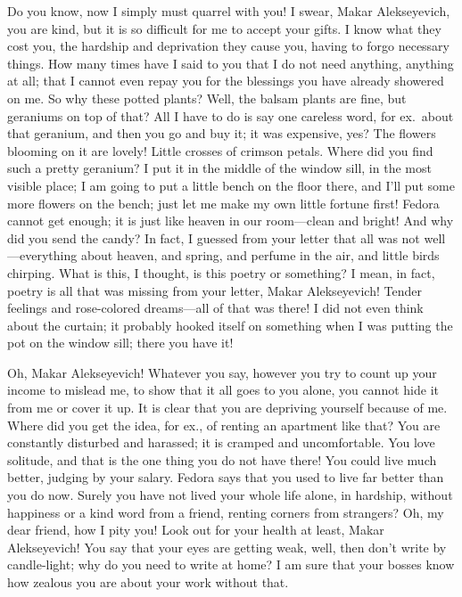 Do you know, now I simply must quarrel with you! I swear, Makar Alekseyevich, you are kind, but it is so difficult for me to accept your gifts. I know what they cost you, the hardship and deprivation they cause you, having to forgo necessary things. How many times have I said to you that I do not need anything, anything at all; that I cannot even repay you for the blessings you have already showered on me. So why these potted plants? Well, the balsam plants are fine, but geraniums on top of that? All I have to do is say one careless word, for ex.~about that geranium, and then you go and buy it; it was expensive, yes? The flowers blooming on it are lovely! Little crosses of crimson petals. Where did you find such a pretty geranium? I put it in the middle of the window sill, in the most visible place; I am going to put a little bench on the floor there, and I'll put some more flowers on the bench; just let me make my own little fortune first! Fedora cannot get enough; it is just like heaven in our room---clean and bright! And why did you send the candy? In fact, I guessed from your letter that all was not well---everything about heaven, and spring, and perfume in the air, and little birds chirping. What is this, I thought, is this poetry or something? I mean, in fact, poetry is all that was missing from your letter, Makar Alekseyevich! Tender feelings and rose-colored dreams---all of that was there! I did not even think about the curtain; it probably hooked itself on something when I was putting the pot on the window sill; there you have it!

Oh, Makar Alekseyevich! Whatever you say, however you try to count up your income to mislead me, to show that it all goes to you alone, you cannot hide it from me or cover it up. It is clear that you are depriving yourself because of me. Where did you get the idea, for ex., of renting an apartment like that? You are constantly disturbed and harassed; it is cramped and uncomfortable. You love solitude, and that is the one thing you do not have there! You could live much better, judging by your salary. Fedora says that you used to live far better than you do now. Surely you have not lived your whole life alone, in hardship, without happiness or a kind word from a friend, renting corners from strangers? Oh, my dear friend, how I pity you! Look out for your health at least, Makar Alekseyevich! You say that your eyes are getting weak, well, then don't write by candle-light; why do you need to write at home? I am sure that your bosses know how zealous you are about your work without that.

